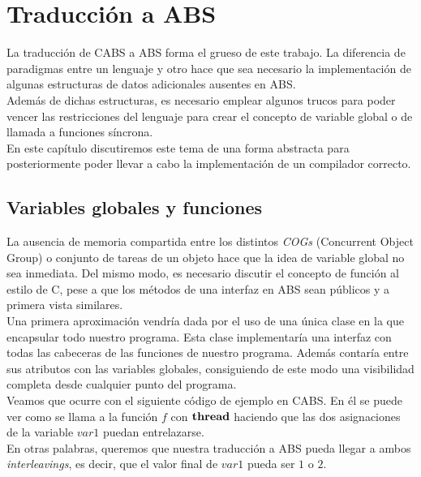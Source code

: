 \chapter{Traducción a ABS}
La traducción de CABS a ABS forma el grueso de este trabajo. La diferencia de paradigmas entre un lenguaje y otro hace que sea necesario la implementación de algunas estructuras de datos adicionales ausentes en ABS.\\

Además de dichas estructuras, es necesario emplear algunos trucos para poder vencer las restricciones del lenguaje para crear el concepto de variable global o de llamada a funciones síncrona.\\

En este capítulo discutiremos este tema de una forma abstracta para posteriormente poder llevar a cabo la implementación de un compilador correcto.

\section{Variables globales y funciones}
La ausencia de memoria compartida entre los distintos \emph{COGs} (Concurrent Object Group) o conjunto de tareas de un objeto hace que la idea de variable global no sea inmediata. Del mismo modo, es necesario discutir el concepto de función al estilo de C, pese a que los métodos de una interfaz en ABS sean públicos y a primera vista similares.\\

Una primera aproximación vendría dada por el uso de una única clase en la que encapsular todo nuestro programa. Esta clase implementaría una interfaz con todas las cabeceras de las funciones de nuestro programa. Además contaría entre sus atributos con las variables globales, consiguiendo de este modo una visibilidad completa desde cualquier punto del programa.\\

Veamos que ocurre con el siguiente código de ejemplo en CABS. En él se puede ver como se llama a la función $f$ con $\textbf{thread}$ haciendo que las dos asignaciones de la variable $var1$ puedan entrelazarse.\\



En otras palabras, queremos que nuestra traducción a ABS pueda llegar a ambos \emph{interleavings}, es decir, que el valor final de $var1$ pueda ser $1$ o $2$.\\

